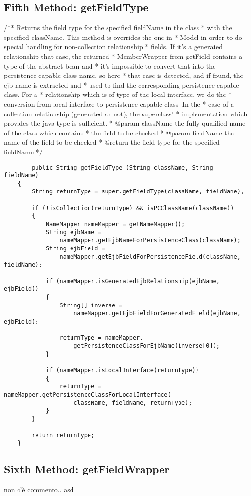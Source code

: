 \newpage
\subsection{Fifth Method: getFieldType} 
	/** Returns the field type for the specified fieldName in the class
	 * with the specified className.  This method is overrides the one in 
	 * Model in order to do special handling for non-collection relationship 
	 * fields.  If it's a generated relationship that case, the returned 
	 * MemberWrapper from getField contains a type of the abstract bean and 
	 * it's impossible to convert that into the persistence capable class name, so here 
	 * that case is detected, and if found, the ejb name is extracted and 
	 * used to find the corresponding persistence capable class.  For a 
	 * relationship which is of type of the local interface, we do the 
	 * conversion from local interface to persistence-capable class.  In the 
	 * case of a collection relationship (generated or not), the superclass' 
	 * implementation which provides the java type is sufficient.
	 * @param className the fully qualified name of the class which contains
	 * the field to be checked
	 * @param fieldName the name of the field to be checked
	 * @return the field type for the specified fieldName
	 */

\begin{lstlisting}
		public String getFieldType (String className, String fieldName)
	{
		String returnType = super.getFieldType(className, fieldName);

		if (!isCollection(returnType) && isPCClassName(className))
		{
			NameMapper nameMapper = getNameMapper();
			String ejbName = 
				nameMapper.getEjbNameForPersistenceClass(className);
			String ejbField = 
				nameMapper.getEjbFieldForPersistenceField(className, fieldName);

			if (nameMapper.isGeneratedEjbRelationship(ejbName, ejbField))
			{
				String[] inverse = 
					nameMapper.getEjbFieldForGeneratedField(ejbName, ejbField);
            
				returnType = nameMapper.
					getPersistenceClassForEjbName(inverse[0]);
			}

			if (nameMapper.isLocalInterface(returnType))
			{
				returnType = nameMapper.getPersistenceClassForLocalInterface(
					className, fieldName, returnType);
			}
		}

		return returnType;
	}
\end{lstlisting}


\newpage
\subsection{Sixth Method: getFieldWrapper} non c'è commento.. asd

